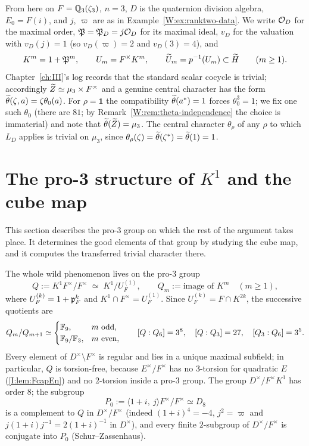 \begin{remark}\label{W:rem:conventions}
From here on $F=\mathbb Q_3(\zeta_3)$, $n=3$, $D$ is the quaternion division
algebra, $E_0=F(i)$, and $j$, $\varpi$ are as in
Example~\ref{W:ex:ranktwo-data}.  We write $\mathcal O_D$ for the maximal
order, $\mathfrak P=\mathfrak P_D=j\mathcal O_D$ for its maximal ideal, $v_D$ for the
valuation with $v_D(j)=1$ (so $v_D(\varpi)=2$ and $v_D(3)=4$), and
\[
 K^m=1+\mathfrak P^m,\qquad U_m=F^\times K^m,\qquad \widetilde U_m=p^{-1}(U_m)\subset\widetilde H
 \qquad(m\ge1).
\]
Chapter~\ref{ch:III}'s log records that the standard scalar cocycle is trivial;
accordingly $\widetilde Z\simeq\mu_3\times F^\times$ and a genuine central
character has the form $\widetilde\theta(\zeta,a)=\zeta\theta_0(a)$.  For
$\rho=\mathbf1$ the compatibility $\widetilde\theta(a^*)=1$ forces
$\theta_0^3=1$; we fix one such $\theta_0$ (there are $81$; by
Remark~\ref{W:rem:theta-independence} the choice is immaterial) and
note that $\widetilde\theta(\widetilde Z)=\mu_3$.  The central character $\theta_\rho$
of any $\rho$ to which $L_D$ applies is trivial on $\mu_3$, since
$\theta_\rho(\zeta)=\widetilde\theta(\zeta^*)=\widetilde\theta(1)=1$.
\end{remark}

\section{\texorpdfstring{The pro-3 structure of $K^1$ and the cube map}{The pro-3 structure of K1 and the cube map}}\label{W:sec:depth}
This section describes the pro-$3$ group on which the rest of the argument takes place. It determines the good elements of that group by studying the cube map, and it computes the transferred trivial character there.

The whole wild phenomenon lives on the pro-$3$ group
\[
 Q:=K^1F^\times/F^\times\;\simeq\;K^1/U_F^{(1)},\qquad
 Q_m:=\text{image of }K^m\quad(m\ge1),
\]
where $U_F^{(k)}=1+\mathfrak p_F^k$ and $K^1\cap F^\times=U_F^{(1)}$.
Since $U_F^{(k)}=F\cap K^{2k}$, the successive quotients are
\begin{equation}\label{W:eq:Qgraded}
 Q_m/Q_{m+1}\simeq\begin{cases}\mathbb F_9,&m\text{ odd},\\ \mathbb F_9/\mathbb F_3,&m\text{ even},\end{cases}
 \qquad [Q:Q_6]=3^8,\quad [Q:Q_3]=27,\quad [Q_3:Q_6]=3^5 .
\end{equation}
Every element of $D^\times\setminus F^\times$ is regular and lies in a
unique maximal subfield; in particular, $Q$ is torsion-free, because
$E^\times/F^\times$ has no $3$-torsion for quadratic $E$ (\cref{I:lem:FcapEn}) and no $2$-torsion inside a pro-$3$ group.
The group $D^\times/F^\times K^1$ has order $8$; the subgroup
\begin{equation}\label{W:eq:P0}
 P_0:=\langle 1+i,\ j\rangle F^\times/F^\times\simeq D_8
\end{equation}
is a complement to $Q$ in $D^\times/F^\times$ (indeed $(1+i)^4=-4$,
$j^2=\varpi$ and $j(1+i)j^{-1}=2(1+i)^{-1}$ in $D^\times$), and every
finite $2$-subgroup of $D^\times/F^\times$ is conjugate into $P_0$
(Schur--Zassenhaus).


